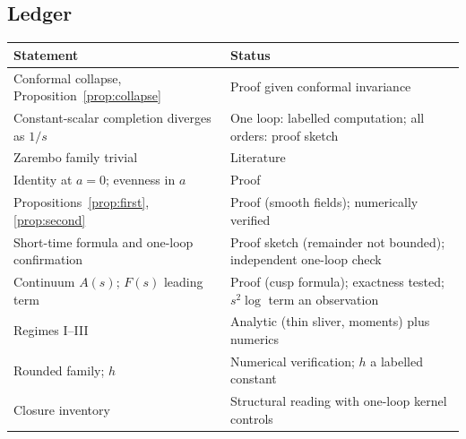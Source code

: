 \subsection*{Ledger}
\begin{center}\small
\begin{tabular}{@{}p{}p{}@{}}
\toprule
Statement & Status\\
\midrule
Conformal collapse, Proposition~\ref{prop:collapse} & Proof given conformal invariance\\
Constant-scalar completion diverges as $1/s$ & One loop: labelled computation; all orders: proof sketch\\
Zarembo family trivial & Literature\\
Identity at $a=0$; evenness in $a$ & Proof\\
Propositions~\ref{prop:first}, \ref{prop:second} & Proof (smooth fields); numerically verified\\
Short-time formula and one-loop confirmation & Proof sketch (remainder not bounded); independent one-loop check\\
Continuum $A(s)$; $F(s)$ leading term & Proof (cusp formula); exactness tested; $s^2\log$ term an observation\\
Regimes I--III & Analytic (thin sliver, moments) plus numerics\\
Rounded family; $h$ & Numerical verification; $h$ a labelled constant\\
Closure inventory & Structural reading with one-loop kernel controls\\
\bottomrule
\end{tabular}
\end{center}
